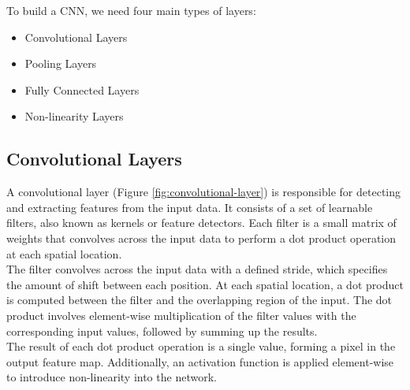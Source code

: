 To build a CNN, we need four main types of layers:

\begin{itemize}
  \item Convolutional Layers
  \item Pooling Layers
  \item Fully Connected Layers
  \item Non-linearity Layers
\end{itemize}

\subsection{Convolutional Layers}

A convolutional layer (Figure \ref{fig:convolutional-layer}) is
responsible for detecting and extracting features from the input data. It
consists of a set of learnable filters, also known as kernels or feature
detectors. Each filter is a small matrix of weights that convolves
across the input data to perform a dot product operation at each spatial
location.  \\

The filter convolves across the input data with a defined stride,
which specifies the amount of shift between each position. At each spatial
location, a dot product is computed between the filter and the overlapping
region of the input. The dot product involves element-wise multiplication of
the filter values with the corresponding input values, followed by summing up
the results. \\

The result of each dot product operation is a single value, forming a pixel in
the output feature map. Additionally, an activation function is applied
element-wise to introduce non-linearity into the network.

